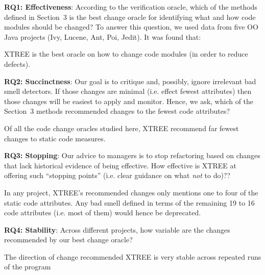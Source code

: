 \documentclass[twocolumn,5p]{elsarticle}
\theoremstyle{break}
\begin{document}
 {\bf  RQ1: Effectiveness}: According to the verification oracle, which of the methods  defined in Section~3 is the best  change oracle for identifying what and how
  code modules should be changed? To answer this question, we used data from five OO Java projects
  (Ivy, Lucene, Ant, Poi, Jedit). It was found that:
  \begin{lesson}
 XTREE is the best oracle on how to change code modules (in order to reduce defects).
  \end{lesson}

 {\bf RQ2: Succinctness}: Our goal is to critique and, possibly,
ignore irrelevant bad smell detectors.  If those changes are minimal (i.e. effect fewest attributes) then those changes
will be easiest to apply and monitor. Hence, we ask, which of the Section~3 methods recommended changes to the fewest
code attributes?
\begin{lesson}
Of all the code change oracles studied here, XTREE recommend  far fewest changes to static code measures.
\end{lesson}

 {\bf RQ3: Stopping}: Our advice to managers is to stop refactoring based on changes that lack
historical evidence of being effective. How effective is XTREE at offering such ``stopping points'' (i.e. clear guidance on what {\em not} to do)??
\begin{lesson}
In  any  project,  XTREE’s  recommended  changes  only  mentions one to four 
of the  static code attributes.  Any bad smell defined in terms of the remaining 19 to 16 code attributes (i.e. most of them)
would hence be deprecated.
\end{lesson}

 {\bf RQ4: Stability}: Across different projects, how variable are the changes recommended by our best change oracle?
\begin{lesson}
The direction of change recommended  XTREE is  very stable across repeated runs of the program 
\end{lesson} 
\end{document}
